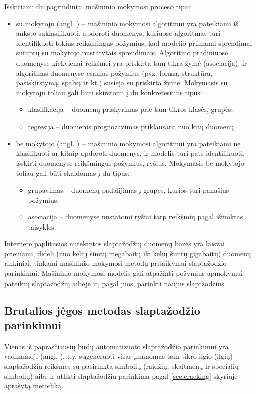 \documentclass{VUMIFInfBakalaurinis}
\begin{document}
Išskiriami du pagrindiniai mašininio mokymosi proceso tipai:
\begin{itemize}
  \item su mokytoju (angl. ) -- mašininio 
    mokymosi algoritmui yra pateikiami iš anksto suklasifikuoti, apdoroti 
    duomenys, kuriuose algoritmas turi identifikuoti tokius reikšmingus 
    požymius, kad modelio priimami sprendimai sutaptų su mokytojo nustatytais 
    sprendimais.
    Algoritmo pradiniuose duomenyse kiekvienai reikšmei yra priskirta tam tikra 
    žymė (asociacija), ir algoritmas duomenyse esamus požymius (pvz. formą, 
    struktūrą, pasiskirstymą, spalvą ir kt.) susieja su priskirta žyme. 
    Mokymasis su mokytoju toliau gali būti skirstomi į du konkretesnius tipus:
    \begin{itemize}
      \item klasifikacija -- duomenų priskyrimas prie tam tikros klasės, grupės;
      \item regresija -- duomenis prognozavimas priklausant nuo kitų duomenų.
    \end{itemize}
  \item be mokytojo (angl. ) -- mašininio 
    mokymosi algoritmui yra pateikiami ne klasifikuoti ar kitaip apdoroti 
    duomenys, ir modelis turi pats identifikuoti, išskirti duomenyse reikšmingus 
    požymius, ryšius. Mokymasis be mokytojo toliau gali būti skaidomas į du 
    tipus:
    \begin{itemize}
      \item grupavimas -- duomenų padalijimas į grupes, kurios turi panašius 
        požymius;
      \item asociacija -- duomenyse nustatomi ryšiai tarp reikšmių pagal 
        išmoktas taisykles.
    \end{itemize}
\end{itemize}

Internete paplitusios nutekintos slaptažodžių duomenų bazės yra laisvai 
prieinami, dideli (nuo kelių šimtų megabaitų iki kelių šimtų gigabaitų) duomenų 
rinkiniai, tinkami mašininio mokymosi metodų pritaikymui slaptažodžio 
parinkimui. Mašininio mokymosi modelis gali atpažinti požymius apmokymui 
pateiktų slaptažodžių aibėje ir, pagal juos, parinkti naujus slaptžodžius.

\subsection{Brutalios jėgos metodas slaptažodžio parinkimui} 
\label{sec:bruteforce}
Vienas iš paprasčiausių būdų automatizuoto slaptažodžio parinkimui yra 
vadinamoji  (angl. ), t.y. 
sugeneruoti visas įmanomas tam tikro ilgio (ilgių) slaptažodžių reikšmes su 
pasirinkta simbolių (raidžių, skaitmenų ir specialių simbolių) aibe ir atlikti 
slaptažodžių parinkimą pagal \ref{sec:cracking} skyriuje aprašytą metodiką.
\end{document}
